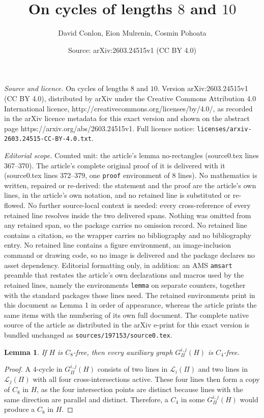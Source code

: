 \documentclass[10pt,a4paper]{amsart}
\title{On cycles of lengths $8$ and $10$}
\author{David Conlon, Eion Mulrenin, Cosmin Pohoata}
\date{Source: arXiv:2603.24515v1 (CC BY 4.0)}
\newtheorem{lemma}{Lemma}
\newcommand{\scL}{\mathscr{L}}
\begin{document}
\maketitle

\noindent\emph{Source and licence.} On cycles of lengths $8$ and $10$. Version arXiv:2603.24515v1 (CC BY 4.0), distributed by arXiv under the Creative Commons Attribution 4.0 International licence, http://creativecommons.org/licenses/by/4.0/, as recorded in the arXiv licence metadata for this exact version and shown on the abstract page https://arxiv.org/abs/2603.24515v1. Full licence notice: \texttt{licenses/arxiv-2603.24515-CC-BY-4.0.txt}.\par\smallskip

\noindent\textit{Editorial scope.} Counted unit: the article's lemma no-rectangles (source0.tex lines 367--370). The article's complete original proof of it is delivered with it (source0.tex lines 372--379, one \texttt{proof} environment of 8 lines). No mathematics is written, repaired or re-derived: the statement and the proof are the article's own lines, in the article's own notation, and no retained line is substituted or re-flowed.  No further source-local context is needed: every cross-reference of every retained line resolves inside the two delivered spans.  Nothing was omitted from any retained span, so the package carries no omission record.  No retained line contains a citation, so the wrapper carries no bibliography and no bibliography entry.  No retained line contains a figure environment, an image-inclusion command or drawing code, so no image is delivered and the package declares no asset dependency.  Editorial formatting only, in addition: an AMS \texttt{amsart} preamble that restates the article's own declarations and macros used by the retained lines, namely the environments \texttt{lemma} on separate counters, together with the standard packages those lines need.  The retained environments print in this document as Lemma 1 in order of appearance, whereas the article prints the same items with the numbering of its own full document.  The complete native source of the article as distributed in the arXiv e-print for this exact version is bundled unchanged as \texttt{sources/197153/source0.tex}.
    \begin{lemma}
    \label{lem: no-rectangles}
        If $H$ is $C_8$-free, then every auxiliary graph $G_\Pi^{i,j}(H)$ is $C_4$-free.
    \end{lemma}

    \begin{proof}
        A $4$-cycle in $G_\Pi^{i,j}(H)$ consists of two lines in $\scL_i(\Pi)$ and two lines in $\scL_j(\Pi)$ with all
        four cross-intersections active. 
        These four lines then form a copy of $C_8$ in $H$, as the four intersection points
        are distinct because lines with the same direction are parallel and distinct. 
        Therefore, a $C_4$ in some
        $G_\Pi^{i,j}(H)$ would produce a $C_8$ in $H$.
    \end{proof}
\end{document}
